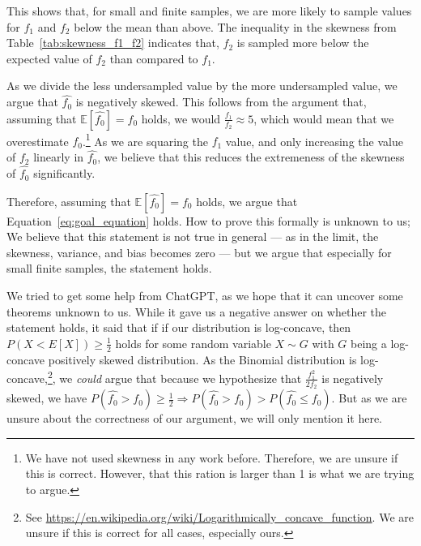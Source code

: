 This shows that, for small and finite samples, we are more likely to sample values for $f_1$ and $f_2$ below the mean than above. The inequality in the skewness from Table~\ref{tab:skewness_f1_f2} indicates that, $f_2$ is sampled more below the expected value of $f_2$ than compared to $f_1$.

As we divide the less undersampled value by the more undersampled value, we argue that $\hat{f_0}$ is negatively skewed. This follows from the argument that, assuming that $\mathbb{E}[\hat{f_0}] = f_0$ holds, we would $\frac{f_1}{f_2} \approx 5$, which would mean that we overestimate $f_0$.\!\footnote{We have not used skewness in any work before. Therefore, we are unsure if this is correct. However, that this ration is larger than 1 is what we are trying to argue.}
As we are squaring the $f_1$ value, and only increasing the value of $f_2$ linearly in $\hat{f_0}$, we believe that this reduces the extremeness of the skewness of $\hat{f_0}$ significantly.

Therefore, assuming that $\mathbb{E}\left[ \hat{f_0} \right] = f_0$ holds, we argue that Equation~\ref{eq:goal_equation} holds.
How to prove this formally is unknown to us; We believe that this statement is not true in general --- as in the limit, the skewness, variance, and bias becomes zero --- but we argue that especially for small finite samples, the statement holds.

We tried to get some help from ChatGPT, as we hope that it can uncover some theorems unknown to us. While it gave us a negative answer on whether the statement holds, it said that if if our distribution is log-concave, then $P(X < E[X]) \geq \frac{1}{2}$ holds for some random variable $X \sim G$ with $G$ being a log-concave positively skewed distribution.
As the Binomial distribution is log-concave,\!\footnote{See \url{https://en.wikipedia.org/wiki/Logarithmically_concave_function}. We are unsure if this is correct for all cases, especially ours.}, we \textit{could} argue that because we hypothesize that $\frac{f_1^2}{2f_2}$ is negatively skewed, we have $P(\hat{f_0} > f_0) \geq \frac{1}{2}\Rightarrow P(\hat{f_0} > f_0) > P(\hat{f_0} \leq f_0)$. But as we are unsure about the correctness of our argument, we will only mention it here.

